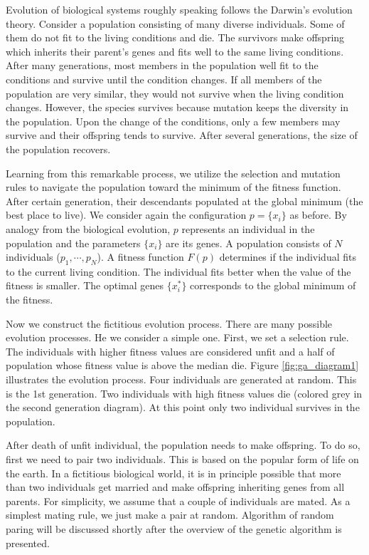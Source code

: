 Evolution of biological systems roughly speaking follows the Darwin's evolution theory. Consider a population consisting of many diverse individuals. Some of them do not fit to the living conditions and die.  The survivors make offspring which inherits their parent's genes and fits well to the same living conditions.  After many generations, most members in the population well fit to the conditions and survive until the condition changes.  If all members of the population are very similar, they would not survive when the living condition changes.  However, the species survives because mutation keeps the diversity in the population.  Upon the change of the conditions, only a few members may survive and their offspring tends to survive.  After several generations, the size of the population recovers.

Learning from this remarkable process, we utilize the selection and mutation rules to navigate the population toward the minimum of the fitness function.  After certain generation, their descendants populated at the global minimum (the best place to live).  
We consider again the configuration $p=\{x_i\}$ as before.  By analogy from the biological evolution, $p$ represents an individual in the population and the parameters $\{x_i\}$ are its genes.  A population consists of $N$ individuals ($p_1, \cdots, p_N$).  A fitness function $F(p)$ determines if the individual fits to the current living condition.  The individual fits better when the value of the fitness is smaller.  The optimal genes $\{x_i^*\}$ corresponds to the global minimum of the fitness.

Now we construct the fictitious evolution process.  There are many possible evolution processes.  He we consider a simple one.
First, we set a selection rule.  The individuals with higher fitness values are considered unfit and a half of population whose fitness value is above the median die.  Figure \ref{fig:ga_diagram1} illustrates the evolution process.  Four individuals are generated at random.  This is the 1st generation.  Two individuals with high fitness values die (colored grey in the second generation diagram).
At this point only two individual survives in the population.



After death of unfit individual, the population needs to make offspring.  To do so, first we need to pair two individuals.  This is based on the popular form of life on the earth.  In a fictitious biological world, it is in principle possible that more than two individuals get married and make offspring inheriting genes from all parents.  For simplicity, we assume that a couple of individuals are mated. As a simplest mating rule,  we just make a pair at random. Algorithm of random paring will be discussed shortly after the overview of the genetic algorithm is presented.

